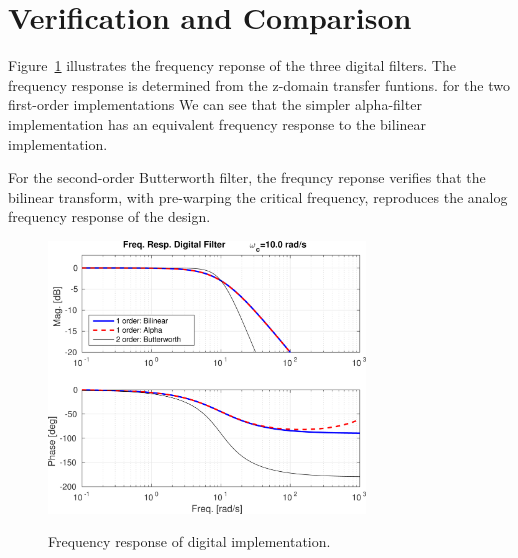 \documentclass[12pt, letterpaper]{article}
\begin{document}
\section{Verification and Comparison}
Figure~\ref{f:imp} illustrates the frequency reponse of the three digital filters.  The frequency response is determined from the z-domain transfer funtions.  for the two first-order implementations We can see that the simpler alpha-filter implementation has an equivalent frequency response to the bilinear implementation.  

For the second-order Butterworth filter, the frequncy reponse verifies that the bilinear transform, with pre-warping the critical frequency, reproduces the analog frequency response of the design.
\begin{figure}[ht!]
\centering
{\includegraphics[width=0.75\textwidth]{filter_freqresp.png}}
\caption{Frequency response of digital implementation.}
\label{f:imp}
\end{figure}
\end{document}
